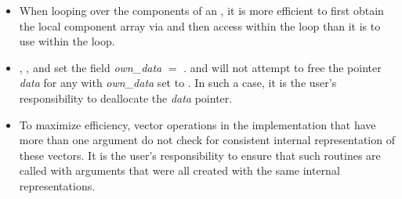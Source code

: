 \begin{itemize}
                                        
\item
  When looping over the components of an  , it is     
  more efficient to first obtain the local component array via       
   and then access  within the     
  loop than it is to use  within the loop.        
                                                               
\item
  {\warn}, , 
  and  set the field 
  {\em own\_data} $=$ . 
   and 
  will not attempt to free the pointer {\em data} for any  with
  {\em own\_data} set to . In such a case, it is the user's responsibility to
  deallocate the {\em data} pointer.

\item
  {\warn}To maximize efficiency, vector operations in the {\nvecph} implementation
  that have more than one  argument do not check for
  consistent internal representation of these vectors. It is the user's 
  responsibility to ensure that such routines are called with 
  arguments that were all created with the same internal representations.

\end{itemize}

